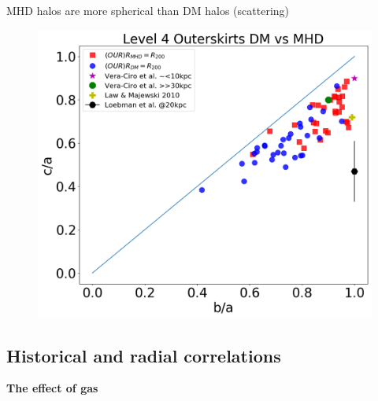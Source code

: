 \documentclass[xcolor=dvipsnames]{beamer}
\begin{document}
\begin{frame}[plain]
\begin{figure}[!ht]
\normalsize
  \label{fig:slices}
\end{figure}


\end{frame}

\begin{frame}

\centering
MHD halos are more spherical than DM halos (scattering)
\begin{figure}[!ht]
  \centering
  \includegraphics[width=0.7\columnwidth]{./pics/Triaxiality_Outter_lvl4.png}
  \hfil
\end{figure}
\normalsize

\end{frame}


\subsection{Historical and radial correlations}
\begin{frame}
\centering
\LARGE
\textbf{The effect of gas}
\normalsize
\end{frame}
\end{document}
